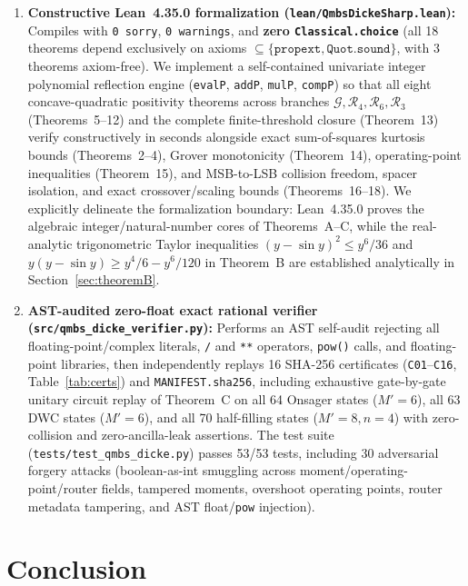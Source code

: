 \documentclass[11pt,a4paper]{article}
\theoremstyle{remark}
\begin{document}
\begin{enumerate}
\item \textbf{Constructive Lean~4.35.0 formalization (\texttt{lean/QmbsDickeSharp.lean}):} Compiles with \texttt{0~sorry}, \texttt{0~warnings}, and \textbf{zero \texttt{Classical.choice}} (all 18 theorems depend exclusively on axioms $\subseteq \{\texttt{propext}, \texttt{Quot.sound}\}$, with 3 theorems axiom-free). We implement a self-contained univariate integer polynomial reflection engine (\texttt{evalP}, \texttt{addP}, \texttt{mulP}, \texttt{compP}) so that all eight concave-quadratic positivity theorems across branches $\mathcal{G}, \mathcal{R}_4, \mathcal{R}_6, \mathcal{R}_3$ (Theorems~5--12) and the complete finite-threshold closure (Theorem~13) verify constructively in seconds alongside exact sum-of-squares kurtosis bounds (Theorems~2--4), Grover monotonicity (Theorem~14), operating-point inequalities (Theorem~15), and MSB-to-LSB collision freedom, spacer isolation, and exact crossover/scaling bounds (Theorems~16--18). We explicitly delineate the formalization boundary: Lean~4.35.0 proves the algebraic integer/natural-number cores of Theorems~A--C, while the real-analytic trigonometric Taylor inequalities $(y-\sin y)^2 \le y^6/36$ and $y(y-\sin y) \ge y^4/6 - y^6/120$ in Theorem~B are established analytically in Section~\ref{sec:theoremB}.
\item \textbf{AST-audited zero-float exact rational verifier (\texttt{src/qmbs\_dicke\_verifier.py}):} Performs an AST self-audit rejecting all floating-point/complex literals, \texttt{/} and \texttt{**} operators, \texttt{pow()} calls, and floating-point libraries, then independently replays 16 SHA-256 certificates (\texttt{C01}--\texttt{C16}, Table~\ref{tab:certs}) and \texttt{MANIFEST.sha256}, including exhaustive gate-by-gate unitary circuit replay of Theorem~C on all 64 Onsager states ($M'=6$), all 63 DWC states ($M'=6$), and all 70 half-filling states ($M'=8, n=4$) with zero-collision and zero-ancilla-leak assertions. The test suite (\texttt{tests/test\_qmbs\_dicke.py}) passes 53/53 tests, including 30 adversarial forgery attacks (boolean-as-int smuggling across moment/operating-point/router fields, tampered moments, overshoot operating points, router metadata tampering, and AST float/\texttt{pow} injection).
\end{enumerate}

\section{Conclusion}
\label{sec:conclusion}
\end{document}
